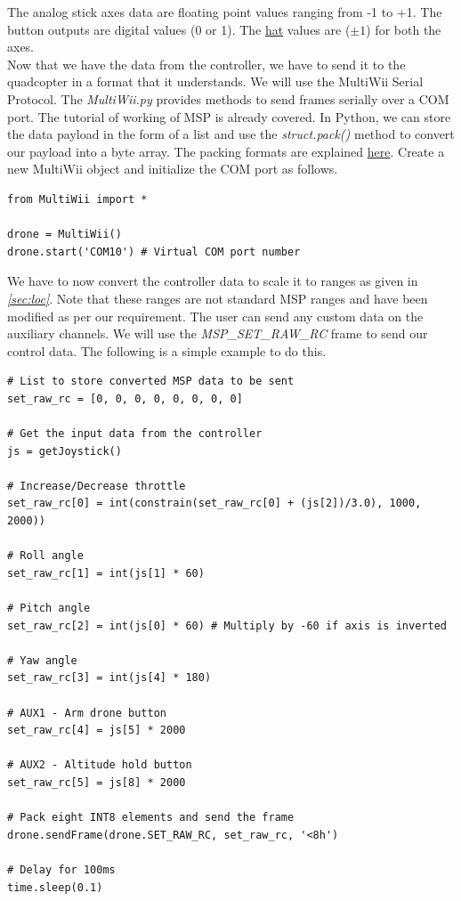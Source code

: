 \documentclass[a4paper,12pt,oneside]{book}
\begin{document}
\bigskip

The analog stick axes data are floating point values ranging from -1 to +1. The button outputs are digital values (0 or 1). The \href{https://en.wikipedia.org/wiki/D-pad}{hat} values are ($\pm1$) for both the axes.\\

Now that we have the data from the controller, we have to send it to the quadcopter in a format that it understands. We will use the MultiWii Serial Protocol. The \textit{MultiWii.py} provides methods to send frames serially over a COM port. The tutorial of working of MSP is already covered. In Python, we can store the data payload in the form of a list and use the \textit{struct.pack()} method to convert our payload into a byte array. The packing formats are explained \href{https://docs.python.org/2/library/struct.html#format-characters}{here}. Create a new MultiWii object and initialize the COM port as follows.\\

\begin{verbatim}
from MultiWii import *

drone = MultiWii()
drone.start('COM10') # Virtual COM port number
\end{verbatim}
\bigskip

We have to now convert the controller data to scale it to ranges as given in \textit{\autoref{sec:loc}}. Note that these ranges are not standard MSP ranges and have been modified as per our requirement. The user can send any custom data on the auxiliary channels. We will use the \textit{MSP{\_}SET{\_}RAW{\_}RC} frame to send our control data. The following is a simple example to do this.\\

\begin{verbatim}
# List to store converted MSP data to be sent
set_raw_rc = [0, 0, 0, 0, 0, 0, 0, 0]

# Get the input data from the controller
js = getJoystick()

# Increase/Decrease throttle
set_raw_rc[0] = int(constrain(set_raw_rc[0] + (js[2])/3.0), 1000, 2000))

# Roll angle
set_raw_rc[1] = int(js[1] * 60)

# Pitch angle
set_raw_rc[2] = int(js[0] * 60) # Multiply by -60 if axis is inverted

# Yaw angle
set_raw_rc[3] = int(js[4] * 180)

# AUX1 - Arm drone button
set_raw_rc[4] = js[5] * 2000

# AUX2 - Altitude hold button
set_raw_rc[5] = js[8] * 2000

# Pack eight INT8 elements and send the frame
drone.sendFrame(drone.SET_RAW_RC, set_raw_rc, '<8h')

# Delay for 100ms
time.sleep(0.1)
\end{verbatim}
\end{document}
